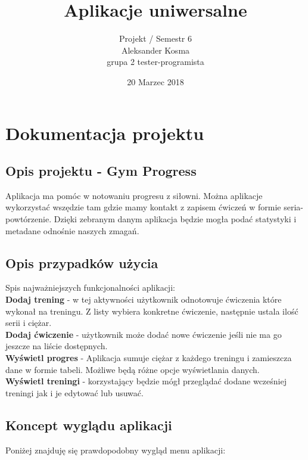 \documentclass[8pt]{article}
\title{Aplikacje uniwersalne}
\author{Projekt / Semestr 6\\ Aleksander Kosma\\grupa 2 tester-programista}
\date{20 Marzec 2018}
\begin{document}
\maketitle 

\section*{Dokumentacja projektu}
\subsection*{ Opis projektu - Gym Progress}
Aplikacja ma pomóc w notowaniu progresu z siłowni. Można aplikacje wykorzystać wszędzie tam gdzie mamy kontakt z zapisem ćwiczeń w formie seria-powtórzenie. Dzięki zebranym danym aplikacja będzie mogła podać statystyki i metadane odnośnie naszych zmagań.
\subsection*{ Opis przypadków użycia}
Spis najważniejszych funkcjonalności aplikacji:\\
\textbf{Dodaj trening} - w tej aktywności użytkownik odnotowuje ćwiczenia które wykonał na treningu. Z listy wybiera konkretne ćwiczenie, następnie ustala ilość serii i ciężar.\\

\textbf{Dodaj ćwiczenie} - użytkownik może dodać nowe ćwiczenie jeśli nie ma go jeszcze na liście dostępnych.\\

\textbf{Wyświetl progres} - Aplikacja sumuje ciężar z każdego treningu i zamieszcza dane w formie tabeli. Możliwe będą różne opcje wyświetlania danych.\\

\textbf{Wyświetl treningi} - korzystający będzie mógł przeglądać dodane wcześniej treningi jak i je edytować lub usuwać.

\subsection*{ Koncept wyglądu aplikacji}
Poniżej znajduję się prawdopodobny wygląd menu aplikacji:
\begin{center}
\end{center}
\end{document}
